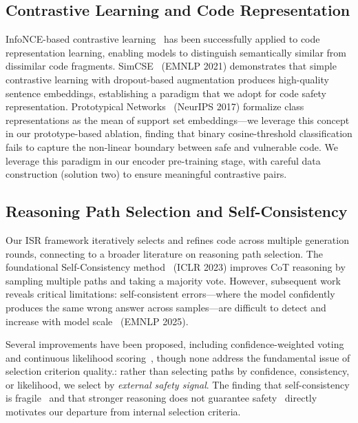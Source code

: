 \documentclass[sigconf,10pt]{acmart}
\begin{document}
\subsection{Contrastive Learning and Code Representation}

InfoNCE-based contrastive learning~\cite{infonce} has been successfully applied to code representation learning, enabling models to distinguish semantically similar from dissimilar code fragments. SimCSE~\cite{simcse} (EMNLP 2021) demonstrates that simple contrastive learning with dropout-based augmentation produces high-quality sentence embeddings, establishing a paradigm that we adopt for code safety representation. Prototypical Networks~\cite{protonet} (NeurIPS 2017) formalize class representations as the mean of support set embeddings---we leverage this concept in our prototype-based ablation, finding that binary cosine-threshold classification fails to capture the non-linear boundary between safe and vulnerable code. We leverage this paradigm in our encoder pre-training stage, with careful data construction (solution two) to ensure meaningful contrastive pairs.

\subsection{Reasoning Path Selection and Self-Consistency}

Our ISR framework iteratively selects and refines code across multiple generation rounds, connecting to a broader literature on reasoning path selection. The foundational Self-Consistency method~\cite{selfconsistency} (ICLR 2023) improves CoT reasoning by sampling multiple paths and taking a majority vote. However, subsequent work reveals critical limitations: self-consistent errors---where the model confidently produces the same wrong answer across samples---are difficult to detect and increase with model scale~\cite{tooconsistent} (EMNLP 2025).

Several improvements have been proposed, including confidence-weighted voting~\cite{cisc} and continuous likelihood scoring~\cite{softsc}, though none address the fundamental issue of selection criterion quality.: rather than selecting paths by confidence, consistency, or likelihood, we select by \textit{external safety signal}. The finding that self-consistency is fragile~\cite{tooconsistent} and that stronger reasoning does not guarantee safety~\cite{safechain,lrmsafety} directly motivates our departure from internal selection criteria.
\end{document}
